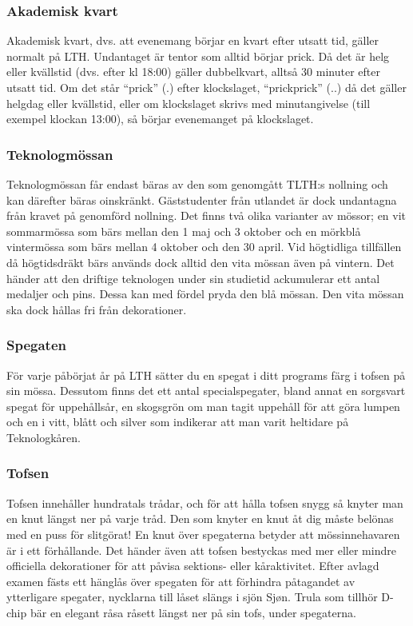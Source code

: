 \subsubsection{Akademisk kvart}
Akademisk kvart, dvs. att evenemang börjar en kvart efter
utsatt tid, gäller normalt på LTH. Undantaget är tentor
som alltid börjar prick. Då det är helg eller kvällstid (dvs.
efter kl 18:00) gäller dubbelkvart, alltså 30 minuter efter
utsatt tid. Om det står ``prick'' (.) efter klockslaget,
``prickprick'' (..) då det gäller helgdag eller kvällstid, eller
om klockslaget skrivs med minutangivelse (till exempel klockan 13:00), så börjar
evenemanget på klockslaget.

\newpage
\subsubsection{Teknologmössan}
Teknologmössan får endast bäras av den som genomgått
TLTH:s nollning och kan därefter bäras oinskränkt.
Gäststudenter från utlandet är dock undantagna från
kravet på genomförd nollning. Det finns två olika varianter
av mössor; en vit sommarmössa som bärs mellan den 1
maj och 3 oktober och en mörkblå vintermössa som bärs
mellan 4 oktober och den 30 april. Vid högtidliga tillfällen
då högtidsdräkt bärs används dock alltid den vita mössan
även på vintern.
Det händer att den driftige teknologen under sin studietid
ackumulerar ett antal medaljer och pins. Dessa kan med
fördel pryda den blå mössan. Den vita mössan ska dock
hållas fri från dekorationer.



\subsubsection{Spegaten}
För varje påbörjat år på LTH sätter du en spegat i ditt
programs färg i tofsen på sin mössa. Dessutom finns det
ett antal specialspegater, bland annat en sorgsvart
spegat för uppehållsår, en skogsgrön om man tagit
uppehåll för att göra lumpen och en i vitt, blått och silver
som indikerar att man varit heltidare på Teknologkåren.

\subsubsection{Tofsen}
Tofsen innehåller hundratals trådar, och för att hålla
tofsen snygg så knyter man en knut längst ner på varje
tråd. Den som knyter en knut åt dig måste belönas med
en puss för slitgörat! En knut över spegaterna betyder att
mössinnehavaren är i ett förhållande. Det händer även att
tofsen bestyckas med mer eller mindre officiella
dekorationer för att påvisa sektions- eller kåraktivitet. Efter
avlagd examen fästs ett hänglås över spegaten för att
förhindra påtagandet av ytterligare spegater, nycklarna till
låset slängs i sjön Sjøn. Trula som tillhör D-chip bär en
elegant råsa råsett längst ner på sin tofs, under
spegaterna.
\newpage
